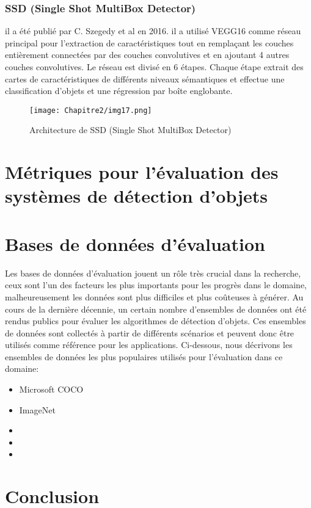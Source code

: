      \subsubsection{SSD (Single Shot MultiBox Detector)} \cite{ssd_paper}
     il a été publié par C. Szegedy et al en 2016. il a utilisé VEGG16 comme réseau principal pour l'extraction de caractéristiques tout en remplaçant les couches entièrement connectées par des couches convolutives et en ajoutant 4 autres couches convolutives. Le réseau est divisé en 6 étapes. Chaque étape extrait des cartes de caractéristiques de différents niveaux sémantiques et effectue une classification d'objets et une régression par boîte englobante.
     \begin{figure}[H]
          \centering
          \texttt{[image: Chapitre2/img17.png]}
          \caption{Architecture de SSD (Single Shot MultiBox Detector)}
          \label{img17}
          \end{figure}

\section{Métriques pour l'évaluation des systèmes de détection d'objets} 

\section{Bases de données d'évaluation} 
Les bases de données d'évaluation jouent un rôle très crucial dans la recherche, ceux sont l'un des facteurs les plus importants pour les progrès dans le domaine, malheureusement les données sont plus difficiles et plus coûteuses à générer. Au cours de la dernière décennie, un certain nombre d'ensembles de données ont été rendus publics pour évaluer les algorithmes de détection d'objets. Ces ensembles de données sont collectés à partir de différents scénarios et peuvent donc être utilisés comme référence pour les applications. Ci-dessous, nous décrivons les ensembles de données  les plus populaires utilisés pour l'évaluation dans ce domaine:

\begin{itemize}
\item Microsoft COCO \cite{db1}

\item ImageNet \cite{db2}
\item 
\item 
\item 
\end{itemize}



\section{Conclusion} 
